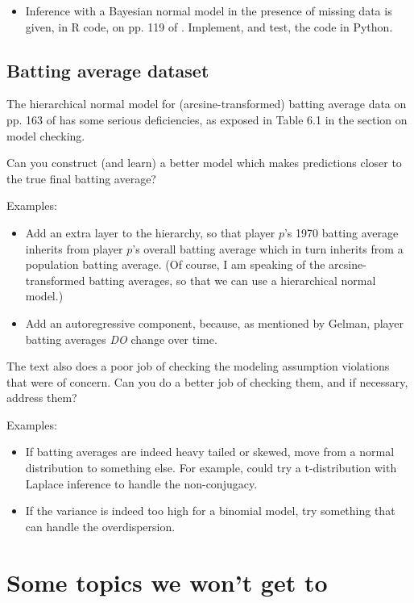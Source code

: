 \documentclass{article} %
\begin{document}
\begin{itemize}
\item  Inference with a Bayesian normal model in the presence of missing data is given,  in R code,  on pp. 119 of \cite{hoff2009first}.    Implement,  and test,  the code in Python.
\end{itemize}

\subsection{Batting average dataset}

The hierarchical normal model for (arcsine-transformed) batting average data on pp.  163 of \cite{gelman2013bayesian} has some serious deficiencies,  as exposed in Table 6.1 in the section on model checking.    

Can you construct (and learn) a better model which makes predictions closer to the true final batting average?
 
Examples:
\begin{itemize}
\item Add an extra layer to the hierarchy,  so that player $p$'s 1970 batting average inherits from player $p$'s overall batting average which in turn inherits from a population batting average.  (Of course,  I am speaking of the arcsine-transformed batting averages,  so that we can use a hierarchical normal model.)
\item Add an autoregressive component, because,  as mentioned by Gelman,  player batting averages \textit{DO} change over time. 
\end{itemize}

The text also does a poor job of checking the modeling assumption violations that were of concern.   Can you do a better job of checking them,  and if necessary,  address them?

Examples:
\begin{itemize}
\item If batting averages are indeed heavy tailed or skewed,  move from a normal distribution to something else.   For example,  could try a t-distribution with Laplace inference to handle the non-conjugacy. 
\item If the variance is indeed too high for a binomial model,  try something that can handle the overdispersion. 
\end{itemize}

\section{Some topics we won't get to}
\end{document}
